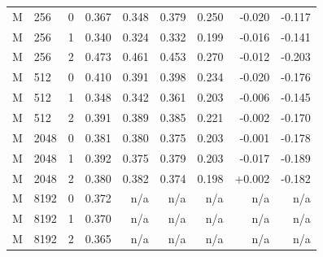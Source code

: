 \begin{table}[!htbp]
\begin{tabular}{@{}llr rrrr rr@{}}
    M & 256 & 0 & 0.367 & 0.348 & 0.379 & 0.250 & -0.020 & -0.117 \\
    M & 256 & 1 & 0.340 & 0.324 & 0.332 & 0.199 & -0.016 & -0.141 \\
    M & 256 & 2 & 0.473 & 0.461 & 0.453 & 0.270 & -0.012 & -0.203 \\
    M & 512 & 0 & 0.410 & 0.391 & 0.398 & 0.234 & -0.020 & -0.176 \\
    M & 512 & 1 & 0.348 & 0.342 & 0.361 & 0.203 & -0.006 & -0.145 \\
    M & 512 & 2 & 0.391 & 0.389 & 0.385 & 0.221 & -0.002 & -0.170 \\
    M & 2048 & 0 & 0.381 & 0.380 & 0.375 & 0.203 & -0.001 & -0.178 \\
    M & 2048 & 1 & 0.392 & 0.375 & 0.379 & 0.203 & -0.017 & -0.189 \\
    M & 2048 & 2 & 0.380 & 0.382 & 0.374 & 0.198 & +0.002 & -0.182 \\
    M & 8192 & 0 & 0.372 & n/a & n/a & n/a & n/a & n/a \\
    M & 8192 & 1 & 0.370 & n/a & n/a & n/a & n/a & n/a \\
    M & 8192 & 2 & 0.365 & n/a & n/a & n/a & n/a & n/a \\
    \bottomrule
  \end{tabular}
\end{table}
